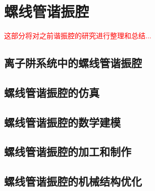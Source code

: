
\chapter[螺线管谐振腔]{螺线管谐振腔}
\textcolor{red}{\small
这部分将对之前谐振腔的研究进行整理和总结...
}
\section[离子阱系统中的螺线管谐振腔]{离子阱系统中的螺线管谐振腔}

\section[螺线管谐振腔的仿真]{螺线管谐振腔的仿真}

\section[螺线管谐振腔的数学建模]{螺线管谐振腔的数学建模}

\section[螺线管谐振腔的加工和制作]{螺线管谐振腔的加工和制作}

\section[螺线管谐振腔的机械结构优化]{螺线管谐振腔的机械结构优化}

